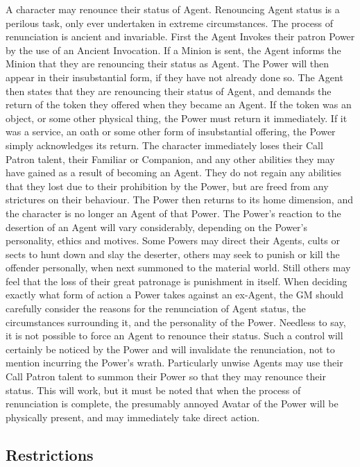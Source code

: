 A character may renounce their status of Agent.  Renouncing Agent
status is a perilous task, only ever undertaken in extreme
circumstances.  The process of renunciation is ancient and invariable.
First the Agent Invokes their patron Power by the use of an Ancient
Invocation.  If a Minion is sent, the Agent informs the Minion that
they are renouncing their status as Agent.  The Power will then appear
in their insubstantial form, if they have not already done so.  The
Agent then states that they are renouncing their status of Agent, and
demands the return of the token they offered when they became an
Agent.  If the token was an object, or some other physical thing, the
Power must return it immediately.  If it was a service, an oath or
some other form of insubstantial offering, the Power simply
acknowledges its return.  The character immediately loses their Call
Patron talent, their Familiar or Companion, and any other abilities
they may have gained as a result of becoming an Agent.  They do not
regain any abilities that they lost due to their prohibition by the
Power, but are freed from any strictures on their behaviour.  The
Power then returns to its home dimension, and the character is no
longer an Agent of that Power.  The Power's reaction to the desertion
of an Agent will vary considerably, depending on the Power's
personality, ethics and motives.  Some Powers may direct their Agents,
cults or sects to hunt down and slay the deserter, others may seek to
punish or kill the offender personally, when next summoned to the
material world.  Still others may feel that the loss of their great
patronage is punishment in itself.  When deciding exactly what form of
action a Power takes against an ex-Agent, the GM should carefully
consider the reasons for the renunciation of Agent status, the
circumstances surrounding it, and the personality of the Power.
Needless to say, it is not possible to force an Agent to renounce
their status.  Such a control will certainly be noticed by the Power
and will invalidate the renunciation, not to mention incurring the
Power's wrath.  Particularly unwise Agents may use their Call Patron
talent to summon their Power so that they may renounce their status.
This will work, but it must be noted that when the process of
renunciation is complete, the presumably annoyed Avatar of the Power
will be physically present, and may immediately take direct action.

\subsection{Restrictions}


